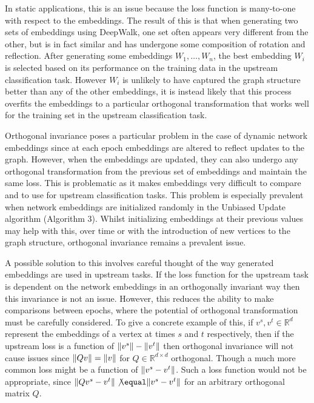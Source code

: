 \documentclass[a4paper]{article}
\begin{document}
In static applications, this is an issue because the loss function is many-to-one with respect to the embeddings. The result of this is that when generating two sets of 
embeddings using DeepWalk, one set often appears very different from the other, but is in fact similar and has undergone some composition of rotation and reflection. After generating 
some embeddings $W_1, \dots, W_n$, the best embedding $W_i$ is selected based on its performance on the training data in the upstream classification task. However $W_i$ is unlikely to have captured the graph structure
better than any of the other embeddings, it is instead likely that this process overfits the embeddings to a particular orthogonal transformation that works well for the training set in the upstream classification task.

Orthogonal invariance poses a particular problem in the case of dynamic network embeddings since at each epoch embeddings are altered to reflect
updates to the graph. However, when the embeddings are updated, they can also undergo any orthogonal transformation from the previous set of embeddings
and maintain the same loss. This is problematic as it makes embeddings very difficult to compare and to use for upstream classification tasks. This problem is especially
prevalent when network embeddings are initialized randomly in the Unbiased Update algorithm (Algorithm 3). Whilst initializing embeddings at their previous values may help with this,
over time or with the introduction of new vertices to the graph structure, orthogonal invariance remains a prevalent issue.

A possible solution to this involves careful thought of the way generated embeddings are used in upstream tasks. If the loss function for the upstream task
is dependent on the network embeddings in an orthogonally invariant way then this invariance is not an issue. However, this reduces the ability to
make comparisons between epochs, where the potential of orthogonal transformation must be carefully considered.
To give a concrete example of this,  if $v^s, v^t \in \mathbb{R}^d$ represent the embeddings of a vertex at times $s$ and $t$ respectively, then
if the upstream loss is a function of $\lVert v^s\rVert-\lVert v^t\rVert$ then orthogonal invariance will not cause issues since $\lVert Qv\rVert = \lVert v\rVert$ for $Q \in \mathbb{R}^{d \times d}$ orthogonal.
Though a much more common loss might be a function of $\lVert v^s - v^t\rVert$. Such a loss function would not be appropriate, since $\norm{Qv^s - v^t} \not\equal \norm{v^s - v^t}$ for an arbitrary
orthogonal matrix $Q$.
\end{document}
